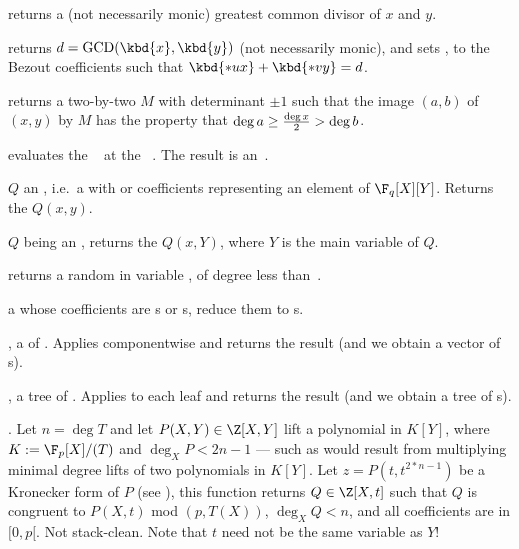  returns a (not necessarily
monic) greatest common divisor of $x$  and $y$.

returns $d = \text{GCD}(\kbd{x},\kbd{y})$ (not necessarily monic), and sets
,  to the Bezout coefficients such that $\kbd{*ux} +
\kbd{*vy} = d$.

 returns a two-by-two
 $M$ with determinant $\pm 1$ such that the image $(a,b)$ of $(x,y)$
by $M$ has the property that $\deg a \geq {\deg x \over 2} > \deg b$.

 evaluates the ~
at the ~. The result is an~.

 $Q$ an ,
i.e.~a  with  or  coefficients representing an
element of $\F_q[X][Y]$. Returns the  $Q(x,y)$.

 $Q$ being an ,
returns the  $Q(x,Y)$, where $Y$ is the main variable of $Q$.

 returns a random
 in variable , of degree less than~.


  a  whose
coefficients are s or s, reduce them to s.

,  a  of . Applies
 componentwise and returns the result (and we obtain a vector
of s).

,  a tree of . Applies
 to each leaf and returns the result (and we obtain a tree
of s).


. Let $n = \deg T$ and let
$P(X,Y)\in \Z[X,Y]$ lift a polynomial in $K[Y]$, where $K := \F_p[X]/(T)$ and
$\deg_X P < 2n-1$ --- such as would result from multiplying minimal degree
lifts of two polynomials in $K[Y]$. Let $z = P(t,t^{2*n-1})$ be a Kronecker
form of $P$ (see ), this function returns $Q\in
\Z[X,t]$ such that $Q$ is congruent to $P(X,t)$ mod $(p, T(X))$, $\deg_X Q <
n$, and all coefficients are in $[0,p[$. Not stack-clean. Note that $t$ need
not be the same variable as $Y$!

